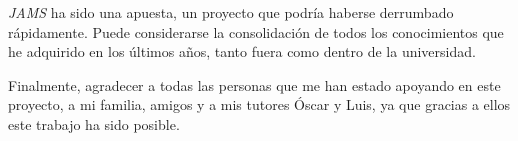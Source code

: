 \textit{JAMS} ha sido una apuesta, un proyecto
que podría haberse derrumbado rápidamente.
Puede considerarse la consolidación de todos los conocimientos
que he adquirido en los últimos años, tanto fuera como dentro
de la universidad.

Finalmente, agradecer a todas las personas que me han
estado apoyando en este proyecto, a mi familia, amigos y a mis
tutores Óscar y Luis, ya que gracias a ellos este trabajo
ha sido posible.
